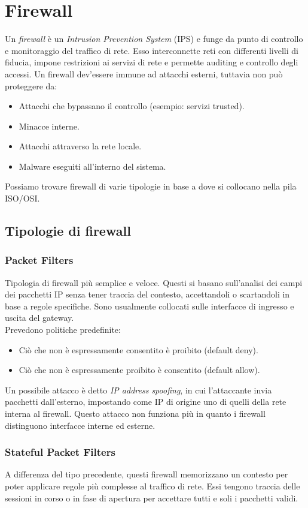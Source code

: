 \documentclass[a4paper, 11pt, twoside, openright, fleqn]{report}
\begin{document}
\chapter{Firewall}
Un \emph{firewall} è un \emph{Intrusion Prevention System} (IPS) e funge da punto di controllo e monitoraggio del traffico di rete. Esso interconnette reti con differenti livelli di fiducia, impone restrizioni ai servizi di rete e permette auditing e controllo degli accessi.
Un firewall dev'essere immune ad attacchi esterni, tuttavia non può proteggere da:
\begin{itemize}
	\item Attacchi che bypassano il controllo (esempio: servizi trusted).
	\item Minacce interne.
	\item Attacchi attraverso la rete locale.
	\item Malware eseguiti all'interno del sistema.
\end{itemize}
Possiamo trovare firewall di varie tipologie in base a dove si collocano nella pila ISO/OSI.

\section{Tipologie di firewall}
\subsection{Packet Filters}
Tipologia di firewall più semplice e veloce. Questi si basano sull'analisi dei campi dei pacchetti IP senza tener traccia del contesto, accettandoli o scartandoli in base a regole specifiche.
Sono usualmente collocati sulle interfacce di ingresso e uscita del gateway.\\
Prevedono politiche predefinite:
\begin{itemize}
	\item Ciò che non è espressamente consentito è proibito (default deny).
	\item Ciò che non è espressamente proibito è consentito (default allow).
\end{itemize}
Un possibile attacco è detto \emph{IP address spoofing}, in cui l'attaccante invia pacchetti dall'esterno, impostando come IP di origine uno di quelli della rete interna al firewall. Questo attacco non funziona più in quanto i firewall distinguono interfacce interne ed esterne.

\subsection{Stateful Packet Filters}
A differenza del tipo precedente, questi firewall memorizzano un contesto per poter applicare regole più complesse al traffico di rete. Essi tengono traccia delle sessioni in corso o in fase di apertura per accettare tutti e soli i pacchetti validi.
\end{document}
